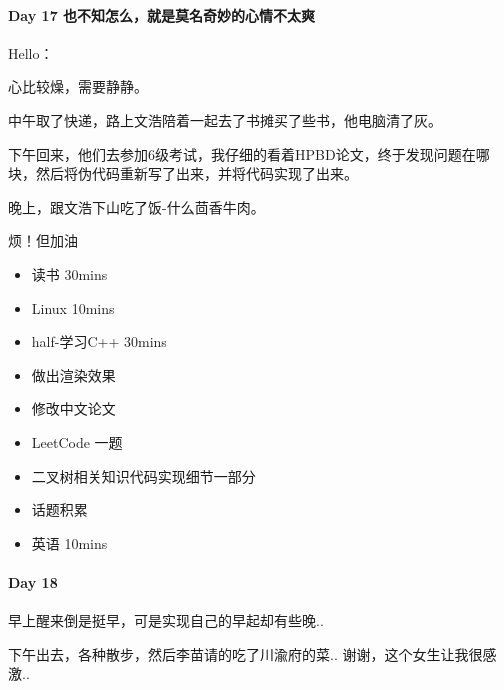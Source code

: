 \documentclass[UTF8,a4paper,8pt]{ctexbook}
\begin{document}
 	 \paragraph{Day 17  也不知怎么，就是莫名奇妙的心情不太爽   \quad     }
		 	 Hello：
		 	 
		 	 心比较燥，需要静静。
		 	 
		 	 中午取了快递，路上文浩陪着一起去了书摊买了些书，他电脑清了灰。
		 	 
		 	 下午回来，他们去参加6级考试，我仔细的看着HPBD论文，终于发现问题在哪块，然后将伪代码重新写了出来，并将代码实现了出来。
		 	 
		 	 晚上，跟文浩下山吃了饭-什么茴香牛肉。
		 	 
		 	 烦！但加油
		 	 \begin{itemize}
		 	 	\item  \makebox[0pt][l]{$\square$}\raisebox{.15ex}{\hspace{0.1em}$\checkmark$}读书  30mins	
		 	 	\item  \makebox[0pt][l]{$\square$}\raisebox{.15ex}{\hspace{0.1em}$\checkmark$}Linux 10mins	  
		 	 	\item  \makebox[0pt][l]{$\square$}\raisebox{.15ex}{\hspace{0.1em}$\checkmark$}half-学习C++ 30mins 
		 	 	\item  做出渲染效果
		 	 	\item  修改中文论文
		 	 	
		 	 	\item  LeetCode 一题
		 	 	\item  二叉树相关知识代码实现细节一部分
		 	 	
		 	 	\item  话题积累 	
		 	 	\item  英语 10mins 	 
		 	 \end{itemize}
 	 \paragraph{Day 18      \quad     }
		 	 早上醒来倒是挺早，可是实现自己的早起却有些晚..
		 	 
		 	 下午出去，各种散步，然后李苗请的吃了川渝府的菜.. 谢谢，这个女生让我很感激..
		 	 
\end{document}

